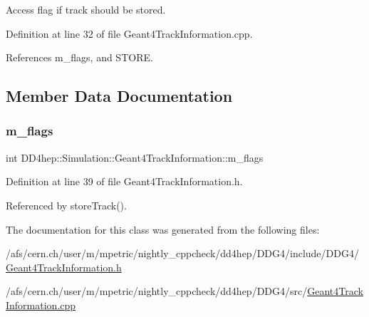 Access flag if track should be stored. 



Definition at line 32 of file Geant4\+Track\+Information.\+cpp.



References m\+\_\+flags, and S\+T\+O\+RE.



\subsection{Member Data Documentation}
\hypertarget{class_d_d4hep_1_1_simulation_1_1_geant4_track_information_ad1b4800b1848a07c234c8b6657a6c4f3}{}\label{class_d_d4hep_1_1_simulation_1_1_geant4_track_information_ad1b4800b1848a07c234c8b6657a6c4f3} 
\subsubsection{\texorpdfstring{m\+\_\+flags}{m\_flags}}
{\footnotesize\ttfamily int D\+D4hep\+::\+Simulation\+::\+Geant4\+Track\+Information\+::m\+\_\+flags\hspace{0.3cm}{\ttfamily [protected]}}



Definition at line 39 of file Geant4\+Track\+Information.\+h.



Referenced by store\+Track().



The documentation for this class was generated from the following files\+:\begin{DoxyCompactItemize}
\item 
/afs/cern.\+ch/user/m/mpetric/nightly\+\_\+cppcheck/dd4hep/\+D\+D\+G4/include/\+D\+D\+G4/\hyperlink{_geant4_track_information_8h}{Geant4\+Track\+Information.\+h}\item 
/afs/cern.\+ch/user/m/mpetric/nightly\+\_\+cppcheck/dd4hep/\+D\+D\+G4/src/\hyperlink{_geant4_track_information_8cpp}{Geant4\+Track\+Information.\+cpp}\end{DoxyCompactItemize}
